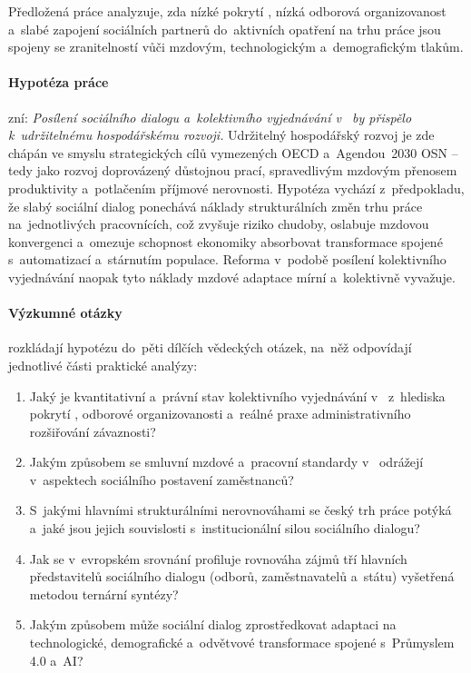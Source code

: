 
Předložená práce analyzuje, zda nízké pokrytí , nízká odborová organizovanost a~slabé zapojení sociálních partnerů do~aktivních opatření na trhu práce jsou spojeny se zranitelností vůči mzdovým, technologickým a~demografickým tlakům.

\paragraph{Hypotéza práce}\label{par:hypoteza} zní: \emph{Posílení sociálního dialogu a~kolektivního vyjednávání v~ by přispělo k~udržitelnému hospodářskému rozvoji.} Udržitelný hospodářský rozvoj je zde chápán ve smyslu strategických cílů vymezených \acs{OECD} a~Agendou~2030 \acs{OSN} -- tedy jako rozvoj doprovázený důstojnou prací, spravedlivým mzdovým přenosem produktivity a~potlačením příjmové nerovnosti. Hypotéza vychází z~předpokladu, že slabý sociální dialog ponechává náklady strukturálních změn trhu práce na~jednotlivých pracovnících, což zvyšuje riziko chudoby, oslabuje mzdovou konvergenci a~omezuje schopnost ekonomiky absorbovat transformace spojené s~automatizací a~stárnutím populace. Reforma v~podobě posílení kolektivního vyjednávání naopak tyto náklady mzdové adaptace mírní a~kolektivně vyvažuje.

\paragraph{Výzkumné otázky}\label{par:vyzkumne_otazky} rozkládají hypotézu do~pěti dílčích vědeckých otázek, na~něž odpovídají jednotlivé části praktické analýzy:
\begin{enumerate}[noitemsep]
  \item Jaký je kvantitativní a~právní stav kolektivního vyjednávání v~ z~hlediska pokrytí , odborové organizovanosti a~reálné praxe administrativního rozšiřování závaznosti?
  \item Jakým způsobem se smluvní mzdové a~pracovní standardy v~ odrážejí v~aspektech sociálního postavení zaměstnanců?
  \item S~jakými hlavními strukturálními nerovnováhami se český trh práce potýká a~jaké jsou jejich souvislosti s~institucionální silou sociálního dialogu?
  \item Jak se v~evropském srovnání profiluje rovnováha zájmů tří hlavních představitelů sociálního dialogu (odborů, zaměstnavatelů a~státu) vyšetřená metodou ternární syntézy?
  \item Jakým způsobem může sociální dialog zprostředkovat adaptaci na technologické, demografické a~odvětvové transformace spojené s~Průmyslem 4.0 a~\acs{AI}?
\end{enumerate}

